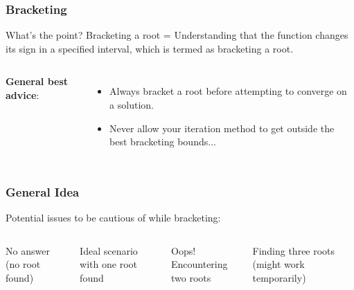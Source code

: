 \begin{frame}[fragile]
  \frametitle{Bracketing}

  \begin{block}{What's the point?}
    Bracketing a root = Understanding that the function changes its sign in a specified interval, which is termed as bracketing a root.
  \end{block}
  \vspace*{1cm}
  \begin{columns}
    \vspace{0.25cm}
    

    \textbf{General best advice}:
    \begin{itemize}
      \item Always bracket a root before attempting to converge on a solution.
      \item Never allow your iteration method to get outside the best bracketing bounds...
    \end{itemize}
  \end{columns}
\end{frame}

{\nologo
\begin{frame}[fragile]
  \frametitle{General Idea}
  Potential issues to be cautious of while bracketing:
  \begin{columns}
    \vspace{0.01cm}
    \newline
    No answer (no root found)
    \vspace{0.8cm}

    \vspace{0.01cm}
    \newline
    Ideal scenario with one root found
    \vspace{0.8cm}

    \vspace{0.01cm}
    \newline
    Oops! Encountering two roots
    \vspace{0.8cm}

    \vspace{0.01cm}
    \newline
    Finding three roots (might work temporarily)
    \vspace{0.8cm}
  \end{columns}
\end{frame}
}

